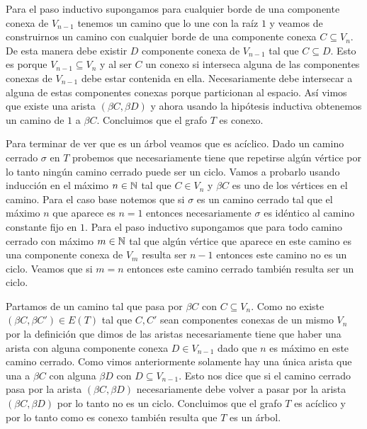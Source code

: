 \documentclass[tesis.tex]{subfiles}
\begin{document}
\begin{ej}
	Para el paso inductivo supongamos para cualquier borde de una componente conexa de $V_{n-1}$ tenemos un camino que lo une con la raíz $1$ y veamos de construirnos un camino con cualquier borde de una componente conexa $C \subseteq V_n$.
	De esta manera debe existir $D$ componente conexa de $V_{n-1}$ tal que $C \subseteq D$. Esto es porque $V_{n-1} \subseteq V_{n}$ y al ser $C$ un conexo si interseca alguna de las componentes conexas de $V_{n-1}$ debe estar contenida en ella. 
	Necesariamente debe intersecar a alguna de estas componentes conexas porque particionan al espacio.
	Así vimos que existe una arista $(\beta C, \beta D)$ y ahora usando la hipótesis inductiva obtenemos un camino de $1$ a $\beta C$.
	Concluimos que el grafo $T$ es conexo.   
	
	Para terminar de ver que es un árbol veamos que es acíclico. 
	Dado un camino cerrado $\sigma$ en $T$ probemos que necesariamente tiene que repetirse algún vértice por lo tanto ningún camino cerrado puede ser un ciclo. Vamos a probarlo usando inducción en el máximo $n \in \mathbb{N}$ tal que $C \in V_n$ y $\beta C$ es uno de los vértices en el camino. 
	Para el caso base notemos que si $\sigma$ es un camino cerrado tal que el máximo $n$ que aparece es $n=1$ entonces necesariamente $\sigma$ es idéntico al camino constante fijo en $1$.
	Para el paso inductivo supongamos que para todo camino cerrado con máximo $m \in \mathbb{N}$ tal que algún vértice que aparece en este camino es una componente conexa de $V_m$ resulta ser $n-1$ entonces este camino no es un ciclo. Veamos que si $m=n$ entonces este camino cerrado también resulta ser un ciclo.
	
	Partamos de un camino tal que pasa por $\beta C$ con $C \subseteq V_n$. 
	Como no existe $(\beta C, \beta C') \in E(T)$ tal que $C,C'$ sean componentes conexas de un mismo $V_n$ por la definición que dimos de las aristas necesariamente tiene que haber una arista con alguna componente conexa $D \in V_{n-1}$ dado que $n$ es máximo en este camino cerrado.   
	Como vimos anteriormente solamente hay una única arista que una a $\beta C$ con alguna $\beta D$ con $D \subseteq V_{n-1}$. 
	Esto nos dice que si el camino cerrado pasa por la arista $(\beta C, \beta D)$ necesariamente debe volver a pasar por la arista $(\beta C, \beta D)$ por lo tanto no es un ciclo. 
	Concluimos que el grafo $T$ es acíclico y por lo tanto como es conexo también resulta que $T$ es un árbol.
	

\end{ej}
\end{document}
